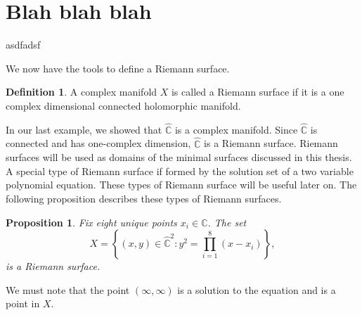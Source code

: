 \documentclass[12pt,oneside,final]{siuethesis}
\newtheorem{proposition}[theorem]{Proposition}
\theoremstyle{definition}
\newtheorem{definition}[theorem]{Definition}
\begin{document}
\section{Blah blah blah}

asdfadsf


We now have the tools to define a Riemann surface.

\begin{definition}
A complex manifold $X$ is called a Riemann surface if it is a one complex dimensional connected holomorphic manifold. \cite{shuai}
\end{definition}

In our last example, we showed that $\hat{\mathbb{C}}$ is a complex manifold. Since $\hat{\mathbb{C}}$ is connected and has one-complex dimension, $\hat{\mathbb{C}}$ is a Riemann surface. Riemann surfaces will be used as domains of the minimal surfaces discussed in this thesis.  A special type of Riemann surface if formed by the solution set of a two variable polynomial equation. These types of Riemann surface will be useful later on. The following proposition describes these types of Riemann surfaces.

\begin{proposition}
Fix eight unique points $x_i \in \mathbb{C}$. The set
\begin{equation}\label{polynomial}
X=\left\{ \left( x,y\right) \in \hat{
\mathbb{C}}^{2}:y^{2}=\prod\limits_{i=1}^{8}\left( x-x_{i}\right) \right\},
\end{equation}
is a Riemann surface.
\end{proposition}
We must note that the point $(\infty,\infty)$ is a solution to the equation and is a point in $X$.
\end{document}
